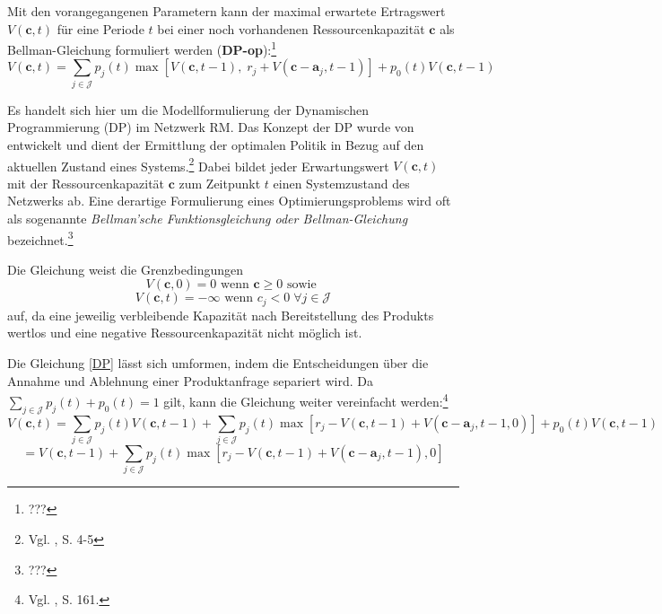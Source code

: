 Mit den vorangegangenen Parametern kann der maximal erwartete Ertragswert $V(\textbf{c},t)$ für eine Periode $t$ bei einer noch vorhandenen Ressourcenkapazität $\textbf{c}$ als Bellman-Gleichung formuliert werden (\textbf{DP-op}):\footnote{???}
\begin{equation}\label{DP}
V(\textbf{c},t)=\sum_{j\in\mathcal{J}}p_{j}(t)\max[ V(\textbf{c},t-1),\; r_{j}+V(\textbf{c}-\textbf{a}_{j},t-1)]+p_{0}(t)V(\textbf{c},t-1)
\end{equation}


Es handelt sich hier um die Modellformulierung der Dynamischen Programmierung (DP) im Netzwerk RM. Das Konzept der DP wurde von \citeauthor{bellman1954theory} entwickelt und dient der Ermittlung der optimalen Politik in Bezug auf den aktuellen Zustand eines Systems.\footnote{Vgl. \cite{bellman1954theory}, S. 4-5} Dabei bildet jeder Erwartungswert $V(\textbf{c},t)$ mit der Ressourcenkapazität $\textbf{c}$ zum Zeitpunkt $t$ einen Systemzustand des Netzwerks ab. Eine derartige Formulierung eines Optimierungsproblems wird oft als sogenannte \textit{Bellman'sche Funktionsgleichung oder Bellman-Gleichung} bezeichnet.\footnote{???}

Die Gleichung weist die Grenzbedingungen
\begin{equation}\label{GB1}
V(\textbf{c},0)=0 \text{ wenn } \textbf{c}\ge0 \text{ sowie }
\end{equation}
\begin{equation}\label{GB2}
V(\textbf{c},t)=-\infty \text{ wenn } c_{j}<0 \;\forall j\in\mathcal{J}
\end{equation}
auf, da eine jeweilig verbleibende Kapazität nach Bereitstellung des Produkts wertlos und eine negative Ressourcenkapazität nicht möglich ist. 

Die Gleichung \eqref{DP} lässt sich umformen, indem die Entscheidungen über die Annahme und Ablehnung einer Produktanfrage separiert wird. Da $\sum_{j\in \mathcal{J}}p_{j}(t)+p_{0}(t)=1$ gilt, kann die Gleichung weiter vereinfacht werden:\footnote{Vgl. \cite{Spengler:2007aa}, S. 161.}
\begin{equation*}
V(\textbf{c},t)=\sum_{j\in\mathcal{J}}p_{j}(t) V(\textbf{c},t-1) + \sum_{j\in\mathcal{J}}p_{j}(t) \max[r_{j}-V(\textbf{c},t-1)+V(\textbf{c}-\textbf{a}_{j},t-1,0)]+p_{0}(t)V(\textbf{c},t-1)
\end{equation*}
\begin{equation}\label{DP2}
=V(\textbf{c},t-1) + \sum_{j\in\mathcal{J}}p_{j}(t) \max[r_{j}-V(\textbf{c},t-1)+V(\textbf{c}-\textbf{a}_{j},t-1),0]
\end{equation}

